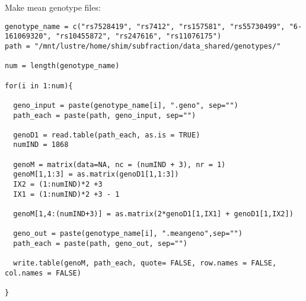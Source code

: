 \documentclass[11pt]{article}
\begin{document}
Make mean genotype files:
\begin{lstlisting}
genotype_name = c("rs7528419", "rs7412", "rs157581", "rs55730499", "6-161069320", "rs10455872", "rs247616", "rs11076175")
path = "/mnt/lustre/home/shim/subfraction/data_shared/genotypes/"

num = length(genotype_name)

for(i in 1:num){

  geno_input = paste(genotype_name[i], ".geno", sep="")
  path_each = paste(path, geno_input, sep="")
  
  genoD1 = read.table(path_each, as.is = TRUE)
  numIND = 1868

  genoM = matrix(data=NA, nc = (numIND + 3), nr = 1)
  genoM[1,1:3] = as.matrix(genoD1[1,1:3])
  IX2 = (1:numIND)*2 +3
  IX1 = (1:numIND)*2 +3 - 1

  genoM[1,4:(numIND+3)] = as.matrix(2*genoD1[1,IX1] + genoD1[1,IX2])

  geno_out = paste(genotype_name[i], ".meangeno",sep="")
  path_each = paste(path, geno_out, sep="")

  write.table(genoM, path_each, quote= FALSE, row.names = FALSE, col.names = FALSE)

}
\end{lstlisting}
\end{document}
